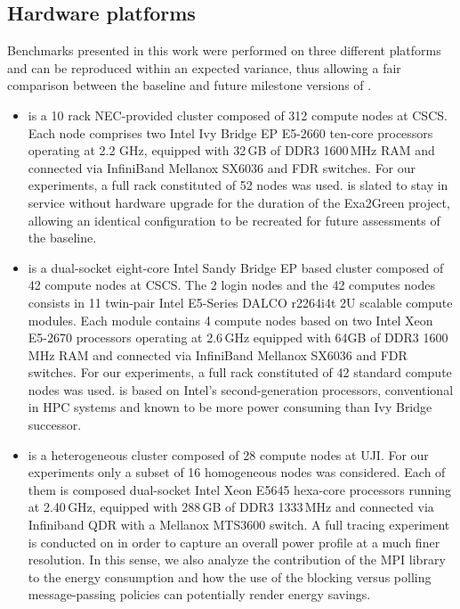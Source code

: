 \subsection{Hardware platforms}
\label{subsec:3.1}

Benchmarks presented  in this work  were performed on  three different
platforms  and can  be reproduced  within an  expected  variance, thus
allowing a  fair comparison between the baseline  and future milestone
versions of \cosmoart.

\begin{itemize}
\item \monch is a 10 rack NEC-provided cluster composed
  of 312 compute  nodes %
   at CSCS. Each
  node comprises two Intel Ivy Bridge EP  E5-2660 ten-core processors
  operating at  2.2 GHz, equipped with 32\,GB of DDR3 1600\,MHz  RAM and connected  via InfiniBand Mellanox  SX6036 and FDR switches. For our  experiments, 
  a full rack constituted of 52 nodes was used. \monch is  slated to stay
  in  service  without  hardware  upgrade  for  the  duration  of  the
  Exa2Green  project,  allowing   an  identical  configuration  to  be
  recreated for future assessments of the baseline.\\

\item \pilat is a dual-socket eight-core Intel Sandy
  Bridge EP based cluster composed of 42 compute nodes %
  at  CSCS.  The 2 login  nodes and
  the 42 computes nodes consists in 11 twin-pair Intel E5-Series DALCO
  r2264i4t 2U scalable compute modules. Each module contains 4 compute
  nodes based  on two Intel Xeon E5-2670 processors operating  at 2.6\,GHz equipped with 64GB of DDR3 1600\,MHz RAM and connected  via InfiniBand Mellanox SX6036 and FDR switches. 
  For our  experiments, a  full rack constituted  of 42 standard  compute nodes
  was used. \pilat  is based  on  Intel's second-generation
  processors, conventional in  HPC systems and known to  be more power
  consuming than Ivy Bridge successor.\\

\item \tinto is  a heterogeneous cluster composed of
  28 compute nodes at UJI. For our  experiments only a subset of 16 homogeneous nodes was considered. Each of them is composed dual-socket Intel Xeon E5645 hexa-core processors 
  running at 2.40\,GHz, equipped with 288\,GB  of DDR3 1333\,MHz and connected via Infiniband QDR with a Mellanox MTS3600 switch. A  full tracing  experiment is  conducted on
  \tinto in order to  capture an overall  power profile at a much
  finer resolution. In this sense, we also analyze the contribution of the MPI library
  to the energy consumption and how the use of the blocking versus polling
  message-passing policies can potentially render energy savings.
\end{itemize}

